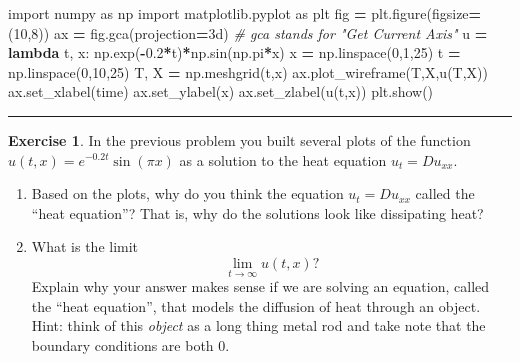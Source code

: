 \documentclass[
]{book}
\newenvironment{Shaded}{\begin{snugshade}}{\end{snugshade}}
\newcommand{\CommentTok}[1]{\textcolor[rgb]{0.56,0.35,0.01}{\textit{#1}}}
\newcommand{\DecValTok}[1]{\textcolor[rgb]{0.00,0.00,0.81}{#1}}
\newcommand{\FloatTok}[1]{\textcolor[rgb]{0.00,0.00,0.81}{#1}}
\newcommand{\ImportTok}[1]{#1}
\newcommand{\KeywordTok}[1]{\textcolor[rgb]{0.13,0.29,0.53}{\textbf{#1}}}
\newcommand{\NormalTok}[1]{#1}
\newcommand{\OperatorTok}[1]{\textcolor[rgb]{0.81,0.36,0.00}{\textbf{#1}}}
\newcommand{\StringTok}[1]{\textcolor[rgb]{0.31,0.60,0.02}{#1}}
\providecommand{\tightlist}{%
  \setlength{\itemsep}{0pt}\setlength{\parskip}{0pt}}
\theoremstyle{definition}
\theoremstyle{definition}
\theoremstyle{definition}
\newtheorem{exercise}{Exercise}[chapter]
\theoremstyle{remark}
\begin{document}
\begin{Shaded}
\begin{Highlighting}[]
\ImportTok{import}\NormalTok{ numpy }\ImportTok{as}\NormalTok{ np}
\ImportTok{import}\NormalTok{ matplotlib.pyplot }\ImportTok{as}\NormalTok{ plt}
\NormalTok{fig }\OperatorTok{=}\NormalTok{ plt.figure(figsize}\OperatorTok{=}\NormalTok{(}\DecValTok{10}\NormalTok{,}\DecValTok{8}\NormalTok{))}
\NormalTok{ax }\OperatorTok{=}\NormalTok{ fig.gca(projection}\OperatorTok{=}\StringTok{\textquotesingle{}3d\textquotesingle{}}\NormalTok{) }\CommentTok{\# gca stands for "Get Current Axis"}
\NormalTok{u }\OperatorTok{=} \KeywordTok{lambda}\NormalTok{ t, x: np.exp(}\OperatorTok{{-}}\FloatTok{0.2}\OperatorTok{*}\NormalTok{t)}\OperatorTok{*}\NormalTok{np.sin(np.pi}\OperatorTok{*}\NormalTok{x)}
\NormalTok{x }\OperatorTok{=}\NormalTok{ np.linspace(}\DecValTok{0}\NormalTok{,}\DecValTok{1}\NormalTok{,}\DecValTok{25}\NormalTok{)}
\NormalTok{t }\OperatorTok{=}\NormalTok{ np.linspace(}\DecValTok{0}\NormalTok{,}\DecValTok{10}\NormalTok{,}\DecValTok{25}\NormalTok{)}
\NormalTok{T, X }\OperatorTok{=}\NormalTok{ np.meshgrid(t,x)}
\NormalTok{ax.plot\_wireframe(T,X,u(T,X))}
\NormalTok{ax.set\_xlabel(}\StringTok{\textquotesingle{}time\textquotesingle{}}\NormalTok{)}
\NormalTok{ax.set\_ylabel(}\StringTok{\textquotesingle{}x\textquotesingle{}}\NormalTok{)}
\NormalTok{ax.set\_zlabel(}\StringTok{\textquotesingle{}u(t,x)\textquotesingle{}}\NormalTok{)}
\NormalTok{plt.show()}
\end{Highlighting}
\end{Shaded}

\begin{center}\rule{0.5\linewidth}{0.5pt}\end{center}

\begin{exercise}
\protect\hypertarget{exr:unnamed-chunk-523}{}{\label{exr:unnamed-chunk-523} }In the previous problem you built several plots of the function \(u(t,x) = e^{-0.2t} \sin(\pi x)\) as a solution to the heat equation \(u_t = D u_{xx}\).

\begin{enumerate}
\def\labelenumi{\alph{enumi}.}
\tightlist
\item
  Based on the plots, why do you think the equation \(u_t = D u_{xx}\) called the ``heat equation''? That is, why do the solutions look like dissipating heat?\\
\item
  What is the limit
  \[ \lim_{t \to \infty} u(t,x)? \]
  Explain why your answer makes sense if we are solving an equation, called the ``heat equation'', that models the diffusion of heat through an object. Hint: think of this \emph{object} as a long thing metal rod and take note that the boundary conditions are both 0.
\end{enumerate}
\end{exercise}
\end{document}
